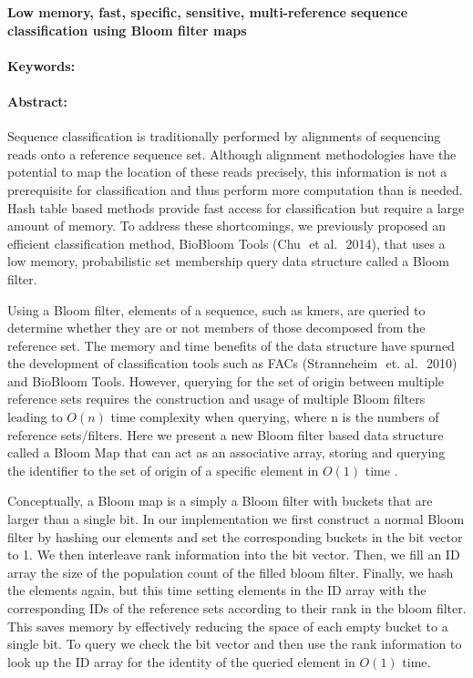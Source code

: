 \noindent
\large {\bf Low memory, fast, specific, sensitive, multi-reference sequence classification using Bloom filter maps} 


\normalsize 


\noindent \paragraph{Keywords:} 

\noindent \paragraph{Abstract:} 

Sequence classification is traditionally performed by alignments of sequencing reads onto a 
reference sequence set. Although alignment methodologies have the potential to map the 
location of these reads precisely, this information is not a prerequisite for classification and thus 
perform more computation than is needed. Hash table based methods provide fast access for 
classification but require a large amount of memory. To address these shortcomings, we 
previously proposed an efficient classification method, BioBloom Tools (Chu ​
et al.  ​
2014), that 
uses a low memory, probabilistic set membership query data structure called a Bloom filter.

Using a Bloom filter, elements of a sequence, such as k­mers, are queried to determine 
whether they are or not members of those decomposed from the reference set. The memory 
and time benefits of the data structure have spurned the development of classification tools 
such as  FACs (Stranneheim ​
et. al. ​
 2010) and BioBloom Tools. However, querying for the set of 
origin between multiple reference sets requires the construction and usage of multiple Bloom 
filters leading to $O(n)$ time complexity when querying, where n is the numbers of reference 
sets/filters. Here we present a new Bloom filter based data structure called a Bloom Map that 
can act as an associative array, storing and querying the identifier to the set of origin of a 
specific element in $O(1)$ time .

Conceptually, a Bloom map is a simply a Bloom filter with buckets that are larger than a single 
bit. In our implementation we first construct a normal Bloom filter by hashing our elements and 
set the corresponding buckets in the bit vector to 1. We then interleave rank information into the 
bit vector. Then, we fill an ID array the size of the population count of the filled bloom filter. 
Finally, we hash the elements again, but this time setting elements in the ID array with the 
corresponding IDs of the reference sets according to their rank in the bloom filter. This saves 
memory by effectively reducing the space of each empty bucket to a single bit. To query we 
check the bit vector and then use the rank information to look up the ID array for the identity of 
the queried element in $O(1)$ time. 

